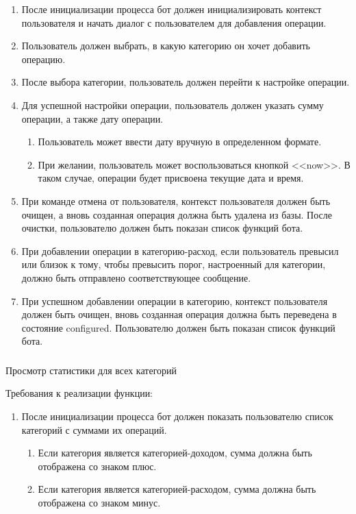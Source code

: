 \begin{enumerate}
	\item После инициализации процесса бот должен инициализировать контекст пользователя и начать диалог с пользователем для добавления операции.
	\item Пользователь должен выбрать, в какую категорию он хочет добавить операцию.
	\item После выбора категории, пользователь должен перейти к настройке операции.
	\item Для успешной настройки операции, пользователь должен указать сумму операции, а также дату операции.
	\begin{enumerate}
		\item Пользователь может ввести дату вручную в определенном формате.
		\item При желании, пользователь может воспользоваться кнопкой <<now>>. В таком случае, операции будет присвоена текущие дата и время.
	\end{enumerate}
	\item При команде отмена от пользователя, контекст пользователя должен быть очищен, а вновь созданная операция должна быть удалена из базы. После очистки, пользователю должен быть показан список функций бота.
	\item При добавлении операции в категорию-расход, если пользователь превысил или близок к тому, чтобы превысить порог, настроенный для категории, должно быть отправлено соответствующее сообщение.
	\item При успешном добавлении операции в категорию, контекст пользователя должен быть очищен, вновь созданная операция должна быть переведена в состояние configured. Пользователю должен быть показан список функций бота.
\end{enumerate}

\subsubsection{} Просмотр статистики для всех категорий
\label{sec:domain:specification:showallstats}

Требования к реализации функции:

\begin{enumerate}
	\item После инициализации процесса бот должен показать пользователю список категорий с суммами их операций.
	\begin{enumerate}
		\item Если категория является категорией-доходом, сумма должна быть отображена со знаком плюс.
		\item Если категория является категорией-расходом, сумма должна быть отображена со знаком минус.
	\end{enumerate}
\end{enumerate}

